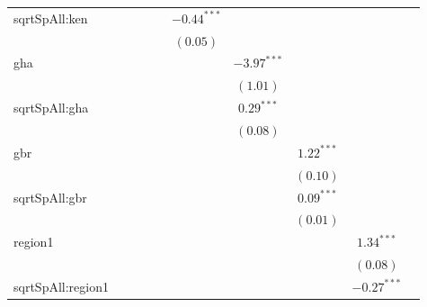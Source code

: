 \begin{sidewaystable}
\begin{center}
{\begin{tabular}{l c c c c c c c c c}
sqrtSpAll:ken     &               &               &               &               & $-0.44^{***}$ &               &               &               &               \\
                  &               &               &               &               & $(0.05)$      &               &               &               &               \\
gha               &               &               &               &               &               & $-3.97^{***}$ &               &               &               \\
                  &               &               &               &               &               & $(1.01)$      &               &               &               \\
sqrtSpAll:gha     &               &               &               &               &               & $0.29^{***}$  &               &               &               \\
                  &               &               &               &               &               & $(0.08)$      &               &               &               \\
gbr               &               &               &               &               &               &               & $1.22^{***}$  &               &               \\
                  &               &               &               &               &               &               & $(0.10)$      &               &               \\
sqrtSpAll:gbr     &               &               &               &               &               &               & $0.09^{***}$  &               &               \\
                  &               &               &               &               &               &               & $(0.01)$      &               &               \\
region1           &               &               &               &               &               &               &               & $1.34^{***}$  &               \\
                  &               &               &               &               &               &               &               & $(0.08)$      &               \\
sqrtSpAll:region1 &               &               &               &               &               &               &               & $-0.27^{***}$ &               \\

\end{tabular}}
\end{center}
\end{sidewaystable}
